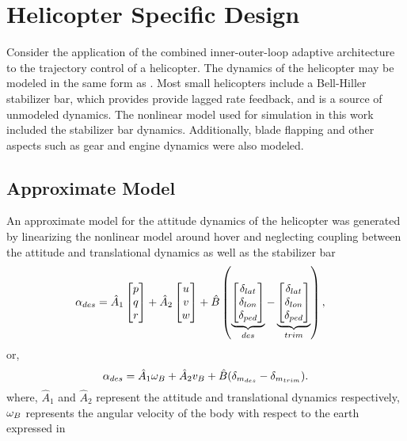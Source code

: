 \section{Helicopter Specific Design}
Consider the application of the combined inner-outer-loop adaptive
architecture to the trajectory control of a helicopter. The dynamics
\cite{munzinger:masters,mettler,gavrilets:gnc:01} of the helicopter
may be modeled in the same form as . Most
small helicopters include a \label{r:bellhillier}Bell-Hiller
stabilizer bar, which provides provide lagged rate feedback, and is a
source of unmodeled dynamics. The nonlinear model used for simulation
in this work included the stabilizer bar dynamics. Additionally,
blade flapping and other aspects such as gear and engine dynamics
were also modeled.
%
\subsection{Approximate Model}
An approximate model for the attitude dynamics of the helicopter was
generated by linearizing the nonlinear model around hover and
neglecting coupling between the attitude and translational dynamics
as well as the stabilizer bar
\begin{align}
\label{e:attinverse} \alpha_{des} &= \hat{A}_1
\begin{bmatrix}
p \\ q \\ r
\end{bmatrix}
+ \hat{A}_2
\begin{bmatrix}
u \\ v \\ w
\end{bmatrix}
+ \hat{B} \left( \underbrace{\begin{bmatrix} \delta_{lat} \\
\delta_{lon} \\ \delta_{ped}
\end{bmatrix}}_{des}
- \underbrace{\begin{bmatrix} \delta_{lat} \\ \delta_{lon} \\
\delta_{ped}
\end{bmatrix}}_{trim}
\right),
\end{align}
or,
\[
\alpha_{des} = \hat{A}_1\omega_B + \hat{A}_2v_B + \hat{B}(\delta_{m_{des}} -
\delta_{m_{trim}}).
\]
%
where, $\hat{A}_1$ and $\hat{A}_2$ represent the attitude and
translational dynamics respectively, $\omega_B$ represents the
angular velocity of the body with respect to the earth expressed in

